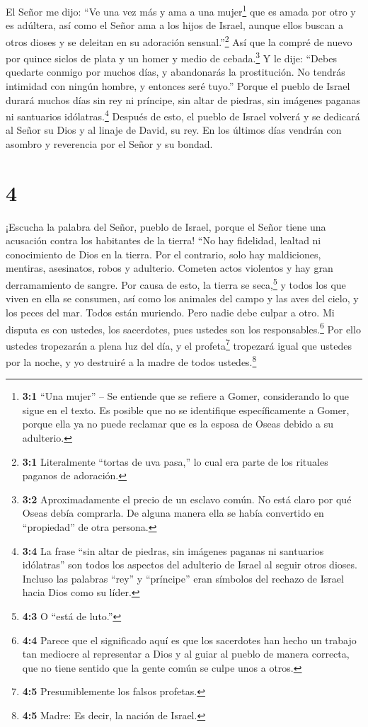  El Señor me dijo: ``Ve una vez más y ama a una
mujer\footnote{\textbf{3:1} ``Una mujer'' -- Se entiende que se refiere
  a Gomer, considerando lo que sigue en el texto. Es posible que no se
  identifique específicamente a Gomer, porque ella ya no puede reclamar
  que es la esposa de Oseas debido a su adulterio.} que es amada por
otro y es adúltera, así como el Señor ama a los hijos de Israel, aunque
ellos buscan a otros dioses y se deleitan en su adoración
sensual.''\footnote{\textbf{3:1} Literalmente ``tortas de uva pasa,'' lo
  cual era parte de los rituales paganos de adoración.}  Así
que la compré de nuevo por quince siclos de plata y un homer y medio de
cebada.\footnote{\textbf{3:2} Aproximadamente el precio de un esclavo
  común. No está claro por qué Oseas debía comprarla. De alguna manera
  ella se había convertido en ``propiedad'' de otra persona.}
 Y le dije: ``Debes quedarte conmigo por muchos días, y
abandonarás la prostitución. No tendrás intimidad con ningún hombre, y
entonces seré tuyo.''  Porque el pueblo de Israel durará
muchos días sin rey ni príncipe, sin altar de piedras, sin imágenes
paganas ni santuarios idólatras.\footnote{\textbf{3:4} La frase ``sin
  altar de piedras, sin imágenes paganas ni santuarios idólatras'' son
  todos los aspectos del adulterio de Israel al seguir otros dioses.
  Incluso las palabras ``rey'' y ``príncipe'' eran símbolos del rechazo
  de Israel hacia Dios como su líder.}  Después de esto, el
pueblo de Israel volverá y se dedicará al Señor su Dios y al linaje de
David, su rey. En los últimos días vendrán con asombro y reverencia por
el Señor y su bondad.

\hypertarget{section-3}{%
\section{4}\label{section-3}}

 ¡Escucha la palabra del Señor, pueblo de Israel, porque el
Señor tiene una acusación contra los habitantes de la tierra! ``No hay
fidelidad, lealtad ni conocimiento de Dios en la tierra. 
Por el contrario, solo hay maldiciones, mentiras, asesinatos, robos y
adulterio. Cometen actos violentos y hay gran derramamiento de sangre.
 Por causa de esto, la tierra se seca,\footnote{\textbf{4:3}
  O ``está de luto.''} y todos los que viven en ella se consumen, así
como los animales del campo y las aves del cielo, y los peces del mar.
Todos están muriendo.  Pero nadie debe culpar a otro. Mi
disputa es con ustedes, los sacerdotes, pues ustedes son los
responsables.\footnote{\textbf{4:4} Parece que el significado aquí es
  que los sacerdotes han hecho un trabajo tan mediocre al representar a
  Dios y al guiar al pueblo de manera correcta, que no tiene sentido que
  la gente común se culpe unos a otros.}  Por ello ustedes
tropezarán a plena luz del día, y el profeta\footnote{\textbf{4:5}
  Presumiblemente los falsos profetas.} tropezará igual que ustedes por
la noche, y yo destruiré a la madre de todos ustedes.\footnote{\textbf{4:5}
  Madre: Es decir, la nación de Israel.}


